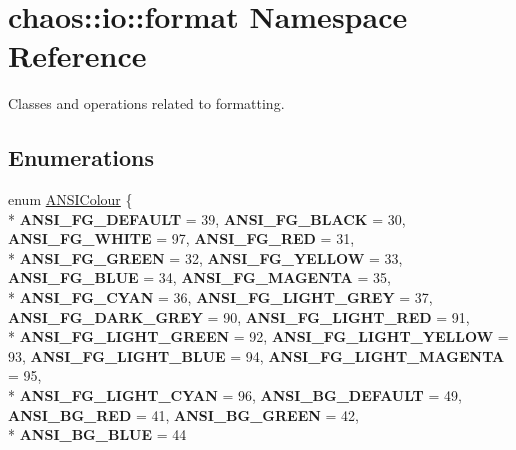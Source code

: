 \hypertarget{namespacechaos_1_1io_1_1format}{\section{chaos\-:\-:io\-:\-:format Namespace Reference}
\label{namespacechaos_1_1io_1_1format}
}


Classes and operations related to formatting.  


\subsection*{Enumerations}
\begin{DoxyCompactItemize}
\item 
enum \hyperlink{namespacechaos_1_1io_1_1format_aa30dcff2478ffc94e33504c8886a5b1a}{A\-N\-S\-I\-Colour} \{ \\*
{\bfseries A\-N\-S\-I\-\_\-\-F\-G\-\_\-\-D\-E\-F\-A\-U\-L\-T} = 39, 
{\bfseries A\-N\-S\-I\-\_\-\-F\-G\-\_\-\-B\-L\-A\-C\-K} = 30, 
{\bfseries A\-N\-S\-I\-\_\-\-F\-G\-\_\-\-W\-H\-I\-T\-E} = 97, 
{\bfseries A\-N\-S\-I\-\_\-\-F\-G\-\_\-\-R\-E\-D} = 31, 
\\*
{\bfseries A\-N\-S\-I\-\_\-\-F\-G\-\_\-\-G\-R\-E\-E\-N} = 32, 
{\bfseries A\-N\-S\-I\-\_\-\-F\-G\-\_\-\-Y\-E\-L\-L\-O\-W} = 33, 
{\bfseries A\-N\-S\-I\-\_\-\-F\-G\-\_\-\-B\-L\-U\-E} = 34, 
{\bfseries A\-N\-S\-I\-\_\-\-F\-G\-\_\-\-M\-A\-G\-E\-N\-T\-A} = 35, 
\\*
{\bfseries A\-N\-S\-I\-\_\-\-F\-G\-\_\-\-C\-Y\-A\-N} = 36, 
{\bfseries A\-N\-S\-I\-\_\-\-F\-G\-\_\-\-L\-I\-G\-H\-T\-\_\-\-G\-R\-E\-Y} = 37, 
{\bfseries A\-N\-S\-I\-\_\-\-F\-G\-\_\-\-D\-A\-R\-K\-\_\-\-G\-R\-E\-Y} = 90, 
{\bfseries A\-N\-S\-I\-\_\-\-F\-G\-\_\-\-L\-I\-G\-H\-T\-\_\-\-R\-E\-D} = 91, 
\\*
{\bfseries A\-N\-S\-I\-\_\-\-F\-G\-\_\-\-L\-I\-G\-H\-T\-\_\-\-G\-R\-E\-E\-N} = 92, 
{\bfseries A\-N\-S\-I\-\_\-\-F\-G\-\_\-\-L\-I\-G\-H\-T\-\_\-\-Y\-E\-L\-L\-O\-W} = 93, 
{\bfseries A\-N\-S\-I\-\_\-\-F\-G\-\_\-\-L\-I\-G\-H\-T\-\_\-\-B\-L\-U\-E} = 94, 
{\bfseries A\-N\-S\-I\-\_\-\-F\-G\-\_\-\-L\-I\-G\-H\-T\-\_\-\-M\-A\-G\-E\-N\-T\-A} = 95, 
\\*
{\bfseries A\-N\-S\-I\-\_\-\-F\-G\-\_\-\-L\-I\-G\-H\-T\-\_\-\-C\-Y\-A\-N} = 96, 
{\bfseries A\-N\-S\-I\-\_\-\-B\-G\-\_\-\-D\-E\-F\-A\-U\-L\-T} = 49, 
{\bfseries A\-N\-S\-I\-\_\-\-B\-G\-\_\-\-R\-E\-D} = 41, 
{\bfseries A\-N\-S\-I\-\_\-\-B\-G\-\_\-\-G\-R\-E\-E\-N} = 42, 
\\*
{\bfseries A\-N\-S\-I\-\_\-\-B\-G\-\_\-\-B\-L\-U\-E} = 44

\end{DoxyCompactItemize}
